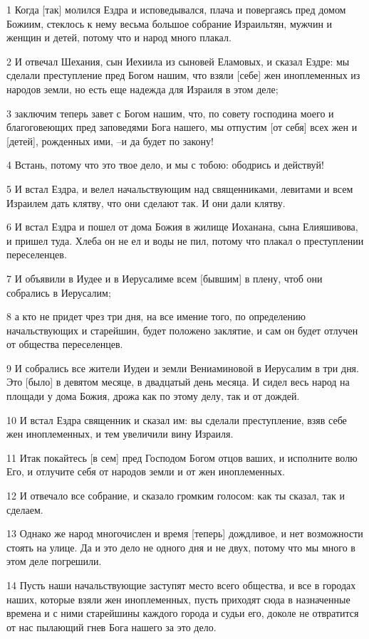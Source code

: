 \par 1 Когда [так] молился Ездра и исповедывался, плача и повергаясь пред домом Божиим, стеклось к нему весьма большое собрание Израильтян, мужчин и женщин и детей, потому что и народ много плакал.
\par 2 И отвечал Шехания, сын Иехиила из сыновей Еламовых, и сказал Ездре: мы сделали преступление пред Богом нашим, что взяли [себе] жен иноплеменных из народов земли, но есть еще надежда для Израиля в этом деле;
\par 3 заключим теперь завет с Богом нашим, что, по совету господина моего и благоговеющих пред заповедями Бога нашего, мы отпустим [от себя] всех жен и [детей], рожденных ими, --и да будет по закону!
\par 4 Встань, потому что это твое дело, и мы с тобою: ободрись и действуй!
\par 5 И встал Ездра, и велел начальствующим над священниками, левитами и всем Израилем дать клятву, что они сделают так. И они дали клятву.
\par 6 И встал Ездра и пошел от дома Божия в жилище Иоханана, сына Елияшивова, и пришел туда. Хлеба он не ел и воды не пил, потому что плакал о преступлении переселенцев.
\par 7 И объявили в Иудее и в Иерусалиме всем [бывшим] в плену, чтоб они собрались в Иерусалим;
\par 8 а кто не придет чрез три дня, на все имение того, по определению начальствующих и старейшин, будет положено заклятие, и сам он будет отлучен от общества переселенцев.
\par 9 И собрались все жители Иудеи и земли Вениаминовой в Иерусалим в три дня. Это [было] в девятом месяце, в двадцатый день месяца. И сидел весь народ на площади у дома Божия, дрожа как по этому делу, так и от дождей.
\par 10 И встал Ездра священник и сказал им: вы сделали преступление, взяв себе жен иноплеменных, и тем увеличили вину Израиля.
\par 11 Итак покайтесь [в сем] пред Господом Богом отцов ваших, и исполните волю Его, и отлучите себя от народов земли и от жен иноплеменных.
\par 12 И отвечало все собрание, и сказало громким голосом: как ты сказал, так и сделаем.
\par 13 Однако же народ многочислен и время [теперь] дождливое, и нет возможности стоять на улице. Да и это дело не одного дня и не двух, потому что мы много в этом деле погрешили.
\par 14 Пусть наши начальствующие заступят место всего общества, и все в городах наших, которые взяли жен иноплеменных, пусть приходят сюда в назначенные времена и с ними старейшины каждого города и судьи его, доколе не отвратится от нас пылающий гнев Бога нашего за это дело.
